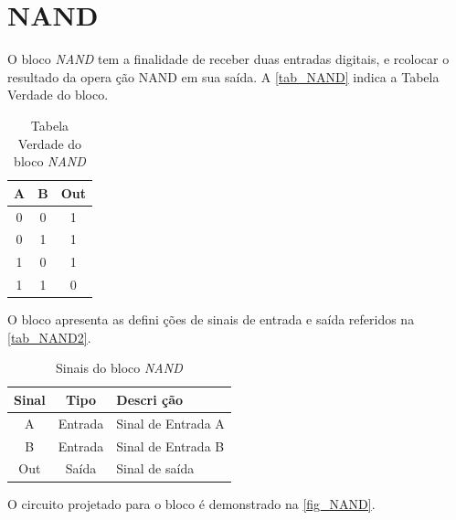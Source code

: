 \renewcommand{\NomeBloco}{\emph{NAND}}
\renewcommand{\NomeBlocoNoIt}{NAND}
\renewcommand{\NomePTab}{tab_\NomeBlocoNoIt}
\renewcommand{\NomeSTab}{tab_\NomeBlocoNoIt2}
\renewcommand{\NomePFig}{fig_\NomeBlocoNoIt}
\renewcommand{\NomeSFig}{fig_\NomeBlocoNoIt2}
\renewcommand{\NomeTTab}{tab_\NomeBlocoNoIt3}

\section{NAND}

O bloco \NomeBloco{} tem a finalidade de receber duas entradas digitais, e rcolocar o resultado da opera ção NAND em sua sa\'ida. A \autoref{\NomePTab} indica a Tabela Verdade do bloco.

\begin{table}[htbp]

\caption{Tabela Verdade do bloco \NomeBloco}%
\label{\NomePTab}
\centering
\begin{tabular}{ccc}
\toprule
    A & B & Out \\
    \midrule \midrule
    0 & 0 & 1 \\
    \midrule
    0 & 1 & 1\\
    \midrule
    1 & 0 & 1\\
    \midrule
    1 & 1 & 0\\
\bottomrule

\end{tabular}
\end{table}

O bloco apresenta as defini ções de sinais de entrada e sa\'ida referidos na \autoref{\NomeSTab}.

\begin{table}[htbp]
\caption{Sinais do bloco \NomeBloco}
\label{\NomeSTab}
\centering
\begin{tabular}{ccl}

    \toprule
    Sinal & Tipo    & Descri ção        \\
    \midrule \midrule
    A    & Entrada & Sinal de Entrada A \\
    \midrule
    B    & Entrada & Sinal de Entrada B \\
    \midrule
    Out    & Sa\'ida & Sinal de sa\'ida \\
    \bottomrule
\end{tabular}
\end{table}

O circuito projetado para o bloco \'e demonstrado na \autoref{\NomePFig}.

